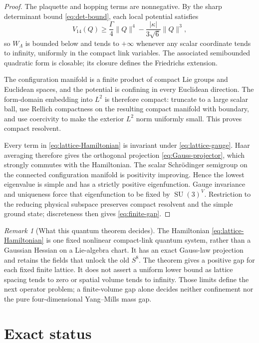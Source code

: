 \documentclass[11pt]{article}
\theoremstyle{definition}
\theoremstyle{remark}
\newtheorem{remark}[theorem]{Remark}
\newcommand{\SU}{\operatorname{SU}}
\begin{document}
\begin{proof}
The plaquette and hopping terms are nonnegative.  By the sharp determinant
bound \eqref{eq:det-bound}, each local potential satisfies
\[
 V_{14}(Q)
 \geq \frac{\Gamma}{4}\|Q\|^4
       -\frac{|\kappa|}{3\sqrt6}\|Q\|^3,
\]
so $W_\Lambda$ is bounded below and tends to $+\infty$ whenever any scalar
coordinate tends to infinity, uniformly in the compact link variables.  The
associated semibounded quadratic form is closable; its closure defines the
Friedrichs extension.

The configuration manifold is a finite product of compact Lie groups and
Euclidean spaces, and the potential is confining in every Euclidean direction.
The form-domain embedding into $L^2$ is therefore compact: truncate to a large
scalar ball, use Rellich compactness on the resulting compact manifold with
boundary, and use coercivity to make the exterior $L^2$ norm uniformly small.
This proves compact resolvent.

Every term in \eqref{eq:lattice-Hamiltonian} is invariant under
\eqref{eq:lattice-gauge}.  Haar averaging therefore gives the orthogonal
projection \eqref{eq:Gauss-projector}, which strongly commutes with the
Hamiltonian.  The scalar Schrödinger semigroup on the connected configuration
manifold is positivity improving.  Hence the lowest eigenvalue is simple and
has a strictly positive eigenfunction.  Gauge invariance and uniqueness force
that eigenfunction to be fixed by $\SU(3)^V$.  Restriction to the reducing
physical subspace preserves compact resolvent and the simple ground state;
discreteness then gives \eqref{eq:finite-gap}.
\end{proof}

\begin{remark}[What this quantum theorem decides]
The Hamiltonian \eqref{eq:lattice-Hamiltonian} is one fixed nonlinear compact-link
quantum system, rather than a Gaussian Hessian on a Lie-algebra chart.  It has
an exact Gauss-law projection and retains the fields that unlock the old
$S^8$.  The theorem gives a positive gap for each fixed finite lattice.  It does
not assert a uniform lower bound as lattice spacing tends to zero or spatial
volume tends to infinity.  Those limits define the next operator problem; a
finite-volume gap alone decides neither confinement nor the pure
four-dimensional Yang--Mills mass gap.
\end{remark}

\section{Exact status}
\end{document}
